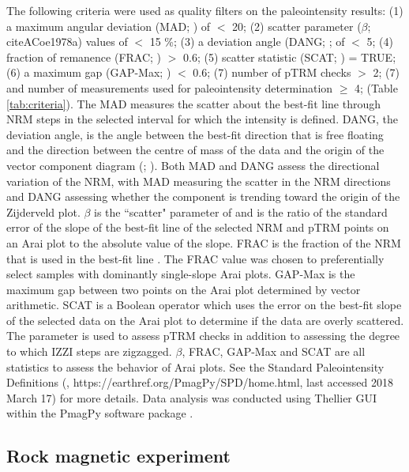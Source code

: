 \documentclass[draft]{agujournal2019}
\begin{document}
The following criteria were used as quality filters on the paleointensity results: (1) a maximum angular deviation (MAD; ) of $<$ 20; (2) scatter parameter ($\beta$; citeA{Coe1978a}) values of $<$ 15 \%; (3) a deviation angle (DANG; ;  of $<$ 5; (4) fraction of remanence (FRAC; ) $>$ 0.6; (5) scatter statistic (SCAT; ) = TRUE; (6) a maximum gap (GAP-Max; ) $<$ 0.6; (7) number of pTRM checks $>$ 2; (7) and number of measurements used for paleointensity determination $\geq$ 4; (Table \ref{tab:criteria}). The MAD measures the scatter about the best-fit line through NRM steps in the selected interval for which the intensity is defined. DANG, the deviation angle, is the angle between the best-fit direction that is free floating and the direction between the centre of mass of the data and the origin of the vector component diagram (; ). Both MAD and DANG assess the directional variation of the NRM, with MAD measuring the scatter in the NRM directions and DANG assessing whether the component is trending toward the origin of the Zijderveld plot. $\beta$ is the ``scatter" parameter of  and is the ratio of the standard error of the slope of the best-fit line of the selected NRM and pTRM points on an Arai plot to the absolute value of the slope. FRAC is the fraction of the NRM that is used in the best-fit line \cite{Shaar2013a}. The FRAC value was chosen to preferentially select samples with dominantly single-slope Arai plots. GAP-Max is the maximum gap between two points on the Arai plot determined by vector arithmetic. SCAT is a Boolean operator which uses the error on the best-fit slope of the selected data on the Arai plot to determine if the data are overly scattered. The parameter is used to assess pTRM checks in addition to assessing the degree to which IZZI steps are zigzagged. $\beta$, FRAC, GAP-Max and SCAT are all statistics to assess the behavior of Arai plots. See the Standard Paleointensity Definitions (, https://earthref.org/PmagPy/SPD/home.html, last accessed 2018 March 17) for more details. Data analysis was conducted using Thellier GUI \cite{Shaar2013a} within the PmagPy software package \cite{Tauxe2016a}. 


\subsection*{Rock magnetic experiment}
\end{document}
